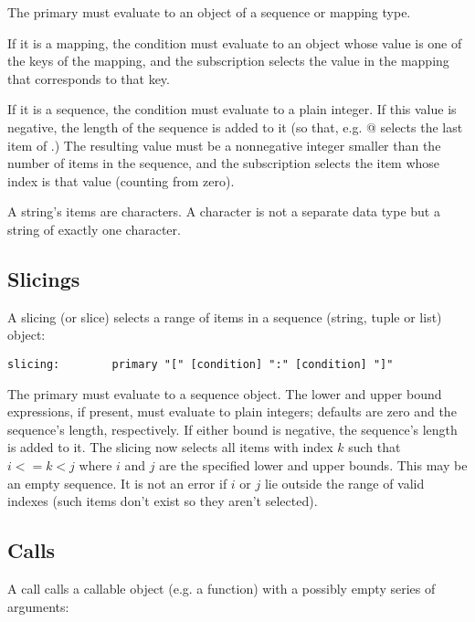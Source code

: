 The primary must evaluate to an object of a sequence or mapping type.

If it is a mapping, the condition must evaluate to an object whose
value is one of the keys of the mapping, and the subscription selects
the value in the mapping that corresponds to that key.

If it is a sequence, the condition must evaluate to a plain integer.
If this value is negative, the length of the sequence is added to it
(so that, e.g. \verb@x[-1]@ selects the last item of \verb@x@.)
The resulting value must be a nonnegative integer smaller than the
number of items in the sequence, and the subscription selects the item
whose index is that value (counting from zero).

A string's items are characters.  A character is not a separate data
type but a string of exactly one character.

\subsection{Slicings}

A slicing (or slice) selects a range of items in a sequence (string,
tuple or list) object:

\begin{verbatim}
slicing:        primary "[" [condition] ":" [condition] "]"
\end{verbatim}

The primary must evaluate to a sequence object.  The lower and upper
bound expressions, if present, must evaluate to plain integers;
defaults are zero and the sequence's length, respectively.  If either
bound is negative, the sequence's length is added to it.  The slicing
now selects all items with index $k$ such that $i <= k < j$ where $i$
and $j$ are the specified lower and upper bounds.  This may be an
empty sequence.  It is not an error if $i$ or $j$ lie outside the
range of valid indexes (such items don't exist so they aren't
selected).

\subsection{Calls} \label{calls}

A call calls a callable object (e.g. a function) with a possibly empty
series of arguments:

